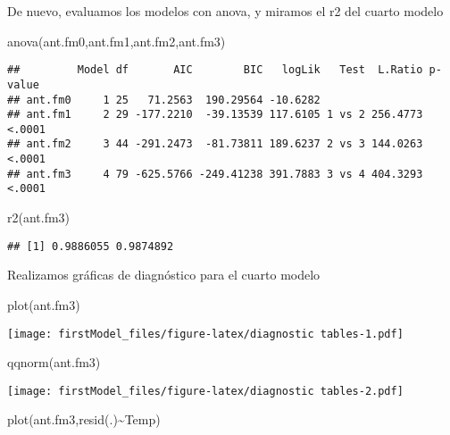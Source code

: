 \documentclass[
]{article}
\newenvironment{Shaded}{\begin{snugshade}}{\end{snugshade}}
\newcommand{\FunctionTok}[1]{\textcolor[rgb]{0.00,0.00,0.00}{#1}}
\newcommand{\NormalTok}[1]{#1}
\newcommand{\SpecialCharTok}[1]{\textcolor[rgb]{0.00,0.00,0.00}{#1}}
\begin{document}
De nuevo, evaluamos los modelos con anova, y miramos el r2 del cuarto
modelo

\begin{Shaded}
\begin{Highlighting}[]
\FunctionTok{anova}\NormalTok{(ant.fm0,ant.fm1,ant.fm2,ant.fm3)}
\end{Highlighting}
\end{Shaded}

\begin{verbatim}
##         Model df       AIC        BIC   logLik   Test  L.Ratio p-value
## ant.fm0     1 25   71.2563  190.29564 -10.6282                        
## ant.fm1     2 29 -177.2210  -39.13539 117.6105 1 vs 2 256.4773  <.0001
## ant.fm2     3 44 -291.2473  -81.73811 189.6237 2 vs 3 144.0263  <.0001
## ant.fm3     4 79 -625.5766 -249.41238 391.7883 3 vs 4 404.3293  <.0001
\end{verbatim}

\begin{Shaded}
\begin{Highlighting}[]
\FunctionTok{r2}\NormalTok{(ant.fm3)}
\end{Highlighting}
\end{Shaded}

\begin{verbatim}
## [1] 0.9886055 0.9874892
\end{verbatim}

Realizamos gráficas de diagnóstico para el cuarto modelo

\begin{Shaded}
\begin{Highlighting}[]
\FunctionTok{plot}\NormalTok{(ant.fm3)}
\end{Highlighting}
\end{Shaded}

\texttt{[image: firstModel\_files/figure-latex/diagnostic tables-1.pdf]}

\begin{Shaded}
\begin{Highlighting}[]
\FunctionTok{qqnorm}\NormalTok{(ant.fm3)}
\end{Highlighting}
\end{Shaded}

\texttt{[image: firstModel\_files/figure-latex/diagnostic tables-2.pdf]}

\begin{Shaded}
\begin{Highlighting}[]
\FunctionTok{plot}\NormalTok{(ant.fm3,}\FunctionTok{resid}\NormalTok{(.)}\SpecialCharTok{\textasciitilde{}}\NormalTok{Temp)}
\end{Highlighting}
\end{Shaded}
\end{document}
